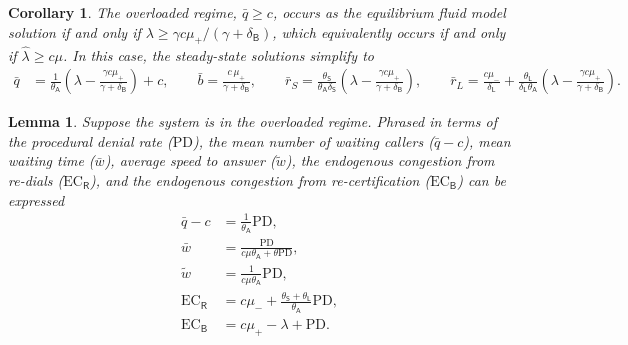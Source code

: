 \documentclass[10pt,a4paper]{amsart}
\newtheorem{corollary}{Corollary}
\newtheorem{lemma}{Lemma}
\begin{document}
\begin{corollary}\label{overCor}
The overloaded regime, $\bar{q} \geq c$, occurs as the equilibrium fluid model solution if and only if $\lambda \geq {\gamma c \mu_{\mathsf{+}}}/({\gamma + \delta_\mathsf{B}})$, which equivalently occurs if and only if $\hat{\lambda} \geq c\mu$. In this case, the steady-state solutions simplify to
\begin{align}
\bar{q}
&= \frac{1}{\theta_{\mathsf{A}}}
\left(\lambda - \frac{\gamma c\mu_{\mathsf{+}} }{\gamma + \delta_{\mathsf{B}}}\right) 
+ c, \qquad 
\bar{b}
= \frac{c\,\mu_{\mathsf{+}}}{\gamma + \delta_{\mathsf{B}}}, 
\qquad 
\bar{r}_S = \frac{\theta_{\mathsf{S}}}{\theta_{\mathsf{A}} \delta_{\mathsf{S}}}
\left(\lambda - \frac{\gamma c\mu_{\mathsf{+}} }{\gamma + \delta_{\mathsf{B}}}\right) ,
\qquad 
\bar{r}_L= \frac{c\mu_{\mathsf{-}}}{\delta_{\mathsf{L}}}
+ \frac{\theta_{\mathsf{L}}}{\delta_{\mathsf{L}} \theta_{\mathsf{A}}}
\left(\lambda - \frac{\gamma c\mu_{\mathsf{+}} }{\gamma + \delta_{\mathsf{B}}}\right) .\label{eqn-steady-state-simplified}
\end{align}
\end{corollary}

\begin{lemma}\label{rateLemma}
Suppose the system is in the overloaded regime. 
Phrased in terms of the procedural denial rate ($\mathrm{PD}$), the mean number of waiting callers ($\bar{q} - c$), mean waiting time ($\bar w$), average speed to answer ($\tilde w$), the endogenous congestion from re-dials ($\mathrm{EC}_\mathsf{R}$), and the endogenous congestion from re-certification ($\mathrm{EC}_\mathsf{B}$) can be expressed
\begin{align}
\bar q - c 
&= 
\frac{1}{\theta_\mathsf{A}}\mathrm{PD}
,
\\
\bar w
&=
\frac{\mathrm{PD}}{c\mu\theta_\mathsf{A} + \theta \mathrm{PD}}
,
\\
\tilde w
&=
\frac{1}{c\mu \theta_\mathsf{A} } \mathrm{PD}
,
\\
\mathrm{EC}_\mathsf{R}
&=
c \mu_-
+
\frac{\theta_\mathsf{S} + \theta_\mathsf{L}}{\theta_\mathsf{A}}
\mathrm{PD}
,
\\
\mathrm{EC}_\mathsf{B}
&=
c\mu_+ - \lambda + \mathrm{PD}
.
\end{align}
\end{lemma}
\end{document}
